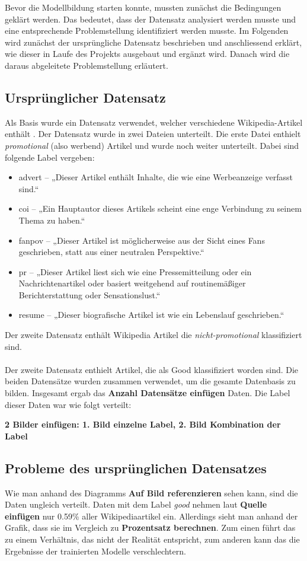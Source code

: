 
Bevor die Modellbildung starten konnte, mussten zunächst die Bedingungen geklärt werden. Das bedeutet, dass der Datensatz analysiert werden musste und eine entsprechende Problemstellung identifiziert werden musste. Im Folgenden wird zunächst der ursprüngliche Datensatz beschrieben und anschliessend erklärt, wie dieser in Laufe des Projekts ausgebaut und ergänzt wird. Danach wird die daraus abgeleitete Problemstellung erläutert.

\subsection{Ursprünglicher Datensatz}
Als Basis wurde ein Datensatz verwendet, welcher  verschiedene Wikipedia-Artikel enthält \cite{UrsprungDatensatz}. Der Datensatz wurde in zwei Dateien unterteilt. Die erste Datei enthielt \emph{promotional} (also werbend) Artikel und wurde noch weiter unterteilt. Dabei sind folgende Label vergeben:
\begin{itemize}
    \item advert – „Dieser Artikel enthält Inhalte, die wie eine Werbeanzeige verfasst sind.“
\item coi – „Ein Hauptautor dieses Artikels scheint eine enge Verbindung zu seinem Thema zu haben.“
\item fanpov – „Dieser Artikel ist möglicherweise aus der Sicht eines Fans geschrieben, statt aus einer neutralen Perspektive.“
\item pr – „Dieser Artikel liest sich wie eine Pressemitteilung oder ein Nachrichtenartikel oder basiert weitgehend auf routinemäßiger Berichterstattung oder Sensationslust.“
\item resume – „Dieser biografische Artikel ist wie ein Lebenslauf geschrieben.“
\end{itemize}
Der zweite Datensatz enthält Wikipedia Artikel die \emph{nicht-promotional} klassifiziert sind.
\\ \\
Der zweite Datensatz enthielt Artikel, die als Good klassifiziert worden sind. Die beiden Datensätze wurden zusammen verwendet, um die gesamte Datenbasis zu bilden. Insgesamt ergab das \textbf{Anzahl Datensätze einfügen} Daten. Die Label dieser Daten war wie folgt verteilt:


\textbf{2 Bilder einfügen: 1. Bild einzelne Label, 2. Bild Kombination der Label}
\\



\subsection{Probleme des ursprünglichen Datensatzes}
Wie man anhand des Diagramms \textbf{Auf Bild referenzieren} sehen kann, sind die Daten ungleich verteilt. Daten mit dem Label \textit{good} nehmen laut \textbf{Quelle einfügen} nur 0.59\% aller Wikipediaartikel ein. Allerdings sieht man anhand der Grafik, dass sie im Vergleich zu \textbf{Prozentsatz berechnen}. Zum einen führt das zu einem Verhältnis, das nicht der Realität entspricht, zum anderen kann das die Ergebnisse der trainierten Modelle verschlechtern.



